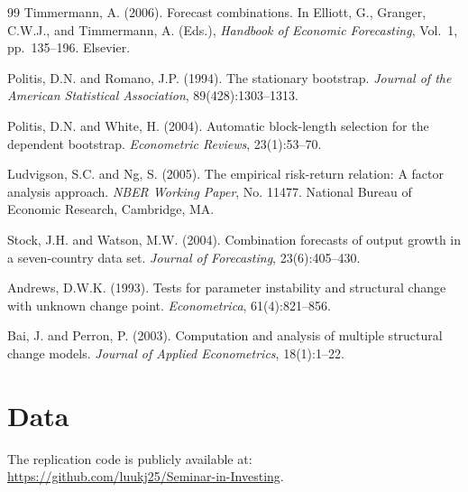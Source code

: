 \documentclass[a4paper,11pt]{article}
\begin{document}
\begin{thebibliography}{99}
Timmermann, A. (2006).
Forecast combinations.
In Elliott, G., Granger, C.W.J., and Timmermann, A. (Eds.),
\textit{Handbook of Economic Forecasting}, Vol.~1, pp.~135--196. Elsevier.

Politis, D.N. and Romano, J.P. (1994).
The stationary bootstrap.
\textit{Journal of the American Statistical Association}, 89(428):1303--1313.

Politis, D.N. and White, H. (2004).
Automatic block-length selection for the dependent bootstrap.
\textit{Econometric Reviews}, 23(1):53--70.

Ludvigson, S.C. and Ng, S. (2005).
The empirical risk-return relation: A factor analysis approach.
\textit{NBER Working Paper}, No. 11477.
National Bureau of Economic Research, Cambridge, MA.

Stock, J.H. and Watson, M.W. (2004).
Combination forecasts of output growth in a seven-country data set.
\textit{Journal of Forecasting}, 23(6):405--430.

Andrews, D.W.K. (1993).
Tests for parameter instability and structural change with unknown change point.
\textit{Econometrica}, 61(4):821--856.

Bai, J. and Perron, P. (2003).
Computation and analysis of multiple structural change models.
\textit{Journal of Applied Econometrics}, 18(1):1--22.


\end{thebibliography}
\endgroup

\newpage

\appendix


\section{Data}\label{app:data}
The replication code is publicly available at: \href{URL}{https://github.com/luukj25/Seminar-in-Investing}.
\\
\end{document}
